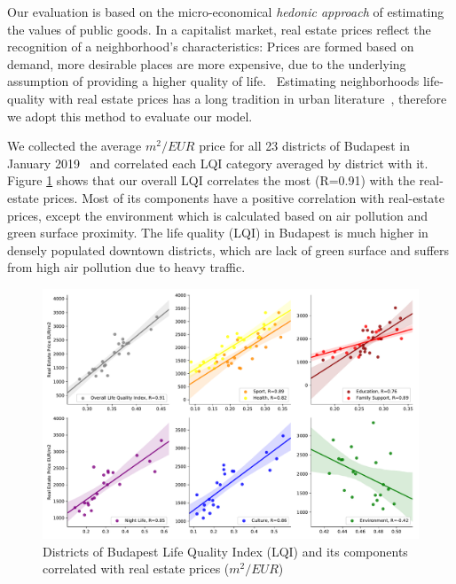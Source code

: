 Our evaluation is based on the micro-economical {\it hedonic approach} of estimating the values of public goods. In a capitalist market, real estate prices reflect the recognition of a neighborhood's characteristics: Prices are formed based on demand, more desirable places are more expensive, due to the underlying assumption of providing a higher quality of life.~\cite{Brueckner1999Central} Estimating neighborhoods life-quality with real estate prices has a long tradition in urban literature~\cite{Roback1982Wages,Blomquist1988New,Lora2011New}, therefore we adopt this method to evaluate our model.

We collected the average $m^{2}/EUR$ price for all 23 districts of Budapest in January 2019~\cite{HU2019RealEstate} and correlated each LQI category averaged by district with it. Figure \ref{fig:LQI_ev} shows that our overall LQI correlates the most (R=0.91) with the real-estate prices. Most of its components have a positive correlation with real-estate prices, except the environment which is calculated based on air pollution and green surface proximity. The life quality (LQI) in Budapest is much higher in densely populated downtown districts, which are lack of green surface and suffers from high air pollution due to heavy traffic.

\begin{figure}[htbp]
	\centering
	\includegraphics[width=\textwidth]{images/lqi/LQI_categories_regplots.pdf}
	\caption[Budapest life quality index correlation with real estate prices]{Districts of Budapest Life Quality Index (LQI) and its components correlated with real estate prices ($m^{2}/EUR$)}
	\label{fig:LQI_ev}
\end{figure}

